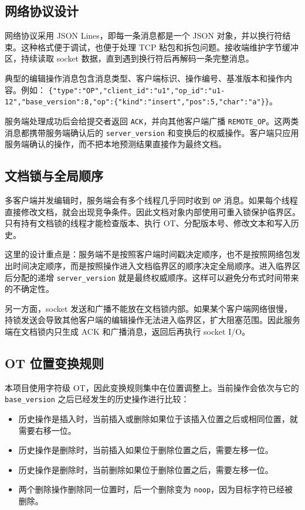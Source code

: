 \subsection{网络协议设计}

网络协议采用 JSON Lines，即每一条消息都是一个 JSON 对象，并以换行符结束。这种格式便于调试，也便于处理 TCP 粘包和拆包问题。接收端维护字节缓冲区，持续读取 socket 数据，直到遇到换行符后再解码一条完整消息。

典型的编辑操作消息包含消息类型、客户端标识、操作编号、基准版本和操作内容。例如：
\verb|{"type":"OP","client_id":"u1","op_id":"u1-12","base_version":8,"op":{"kind":"insert","pos":5,"char":"a"}}|。

服务端处理成功后会给提交者返回 \verb|ACK|，并向其他客户端广播 \verb|REMOTE_OP|。这两类消息都携带服务端确认后的 \verb|server_version| 和变换后的权威操作。客户端只应用服务端确认的操作，而不把本地预测结果直接作为最终文档。

\subsection{文档锁与全局顺序}

多客户端并发编辑时，服务端会有多个线程几乎同时收到 \verb|OP| 消息。如果每个线程直接修改文档，就会出现竞争条件。因此文档对象内部使用可重入锁保护临界区。只有持有文档锁的线程才能检查版本、执行 OT、分配版本号、修改文本和写入历史。

这里的设计重点是：服务端不是按照客户端时间戳决定顺序，也不是按照网络包发出时间决定顺序，而是按照操作进入文档临界区的顺序决定全局顺序。进入临界区后分配的递增 \verb|server_version| 就是最终权威顺序。这样可以避免分布式时间带来的不确定性。

另一方面，socket 发送和广播不能放在文档锁内部。如果某个客户端网络很慢，持锁发送会导致其他客户端的编辑操作无法进入临界区，扩大阻塞范围。因此服务端在文档锁内只生成 ACK 和广播消息，返回后再执行 socket I/O。

\subsection{OT 位置变换规则}

本项目使用字符级 OT，因此变换规则集中在位置调整上。当前操作会依次与它的 \verb|base_version| 之后已经发生的历史操作进行比较：

\begin{itemize}
  \item 历史操作是插入时，当前插入或删除如果位于该插入位置之后或相同位置，就需要右移一位。
  \item 历史操作是删除时，当前插入如果位于删除位置之后，需要左移一位。
  \item 历史操作是删除时，当前删除如果位于删除位置之后，需要左移一位。
  \item 两个删除操作删除同一位置时，后一个删除变为 \verb|noop|，因为目标字符已经被删除。
\end{itemize}

